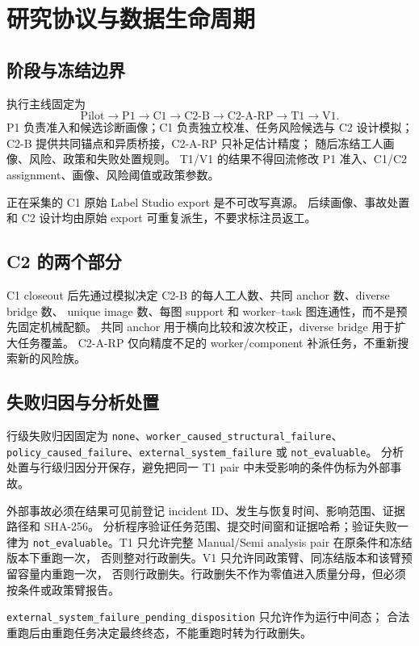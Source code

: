 \section{研究协议与数据生命周期}

\subsection{阶段与冻结边界}

执行主线固定为
\[
\text{Pilot}\rightarrow\text{P1}\rightarrow\text{C1}\rightarrow
\text{C2-B}\rightarrow\text{C2-A-RP}\rightarrow\text{T1}\rightarrow\text{V1}.
\]
P1 负责准入和候选诊断画像；C1 负责独立校准、任务风险候选与 C2 设计模拟；
C2-B 提供共同锚点和异质桥接，C2-A-RP 只补足估计精度；
随后冻结工人画像、风险、政策和失败处置规则。
T1/V1 的结果不得回流修改 P1 准入、C1/C2 assignment、画像、风险阈值或政策参数。

正在采集的 C1 原始 Label Studio export 是不可改写真源。
后续画像、事故处置和 C2 设计均由原始 export 可重复派生，不要求标注员返工。

\subsection{C2 的两个部分}

C1 closeout 后先通过模拟决定 C2-B 的每人工人数、共同 anchor 数、diverse bridge 数、
unique image 数、每图 support 和 worker--task 图连通性，而不是预先固定机械配额。
共同 anchor 用于横向比较和波次校正，diverse bridge 用于扩大任务覆盖。
C2-A-RP 仅向精度不足的 worker/component 补派任务，不重新搜索新的风险族。

\subsection{失败归因与分析处置}

行级失败归因固定为
\texttt{none}、\texttt{worker\_caused\_structural\_failure}、
\texttt{policy\_caused\_failure}、\texttt{external\_system\_failure}
或 \texttt{not\_evaluable}。
分析处置与行级归因分开保存，避免把同一 T1 pair 中未受影响的条件伪标为外部事故。

外部事故必须在结果可见前登记 incident ID、发生与恢复时间、影响范围、证据路径和 SHA-256。
分析程序验证任务范围、提交时间窗和证据哈希；验证失败一律为
\texttt{not\_evaluable}。T1 只允许完整 Manual/Semi analysis pair 在原条件和冻结版本下重跑一次，
否则整对行政删失。V1 只允许同政策臂、同冻结版本和该臂预留容量内重跑一次，
否则行政删失。行政删失不作为零值进入质量分母，但必须按条件或政策臂报告。

\texttt{external\_system\_failure\_pending\_disposition} 只允许作为运行中间态；
合法重跑后由重跑任务决定最终终态，不能重跑时转为行政删失。

